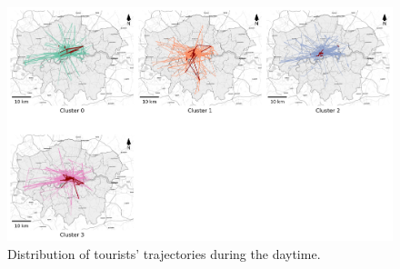 \documentclass{article}
\theoremstyle{definition}
\theoremstyle{remark}
\begin{document}
\begin{figure}[!h]
\centering
\includegraphics[width=1\textwidth]{figures/traj_distribution_daytime_tourists.png}
\caption{\label{fig:traj_distribution_daytime_tourists}Distribution of tourists' trajectories during the daytime.}
\end{figure}
\end{document}
